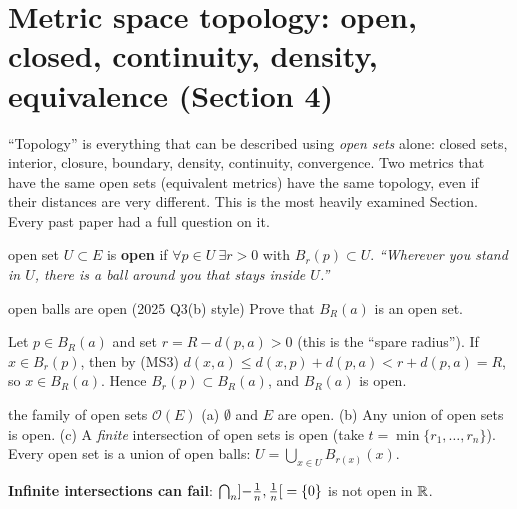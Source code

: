 \section{Metric space topology: open, closed, continuity, density, equivalence (Section 4)}

\begin{plain}
``Topology'' is everything that can be described using \emph{open sets} alone: closed sets,
interior, closure, boundary, density, continuity, convergence. Two metrics that have the same
open sets (equivalent metrics) have the same topology, even if their distances are very different.
This is the most heavily examined Section. Every past paper had a full question on it.
\end{plain}

\begin{defn}{open set}
$U\subset E$ is \textbf{open} if $\forall p\in U\ \exists r>0$ with $B_r(p)\subset U$.
\emph{``Wherever you stand in $U$, there is a ball around you that stays inside $U$.''}
\end{defn}

\begin{exam}{open balls are open (2025 Q3(b) style)}
Prove that $B_R(a)$ is an open set.
\end{exam}
\begin{answer}
Let $p\in B_R(a)$ and set $r=R-d(p,a)>0$ (this is the ``spare radius''). If $x\in B_r(p)$, then
by (MS3) $d(x,a)\le d(x,p)+d(p,a)<r+d(p,a)=R$, so $x\in B_R(a)$. Hence $B_r(p)\subset B_R(a)$,
and $B_R(a)$ is open.
\end{answer}
\begin{center}
\end{center}

\begin{thm}{the family of open sets $\mathcal O(E)$}
(a) $\emptyset$ and $E$ are open. (b) Any union of open sets is open.
(c) A \emph{finite} intersection of open sets is open (take $t=\min\{r_1,\dots,r_n\}$).
Every open set is a union of open balls: $U=\bigcup_{x\in U}B_{r(x)}(x)$.
\end{thm}
\textbf{Infinite intersections can fail}: $\bigcap_{n}\mathopen{]}-\frac1n,\frac1n\mathclose{[}=\{0\}$ is not open
in $\mathbb R$.


